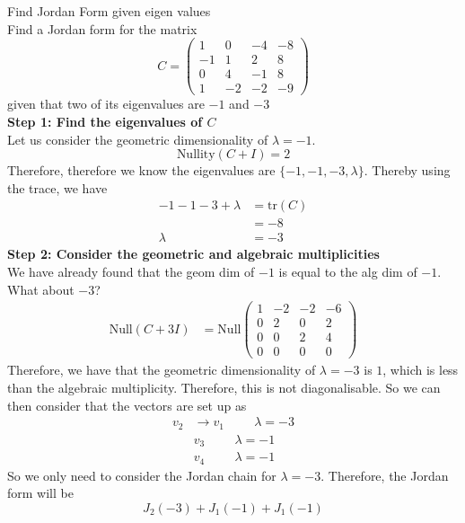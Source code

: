 \documentclass[journal, letterpaper]{IEEEtran}
\begin{document}
    \begin{myboxg}{Find Jordan Form given eigen values} \\
        Find a Jordan form for the matrix
        $$ C = \begin{pmatrix}
            1 & 0 & -4 & -8 \\ -1 & 1 & 2 & 8 \\ 0 & 4 & -1 & 8 \\ 1 & -2 & -2 & -9
        \end{pmatrix}$$
        given that two of its eigenvalues are $-1$ and $-3$
        \newline \\
        \textbf{Step 1: Find the eigenvalues of $C$}\\ Let us consider the geometric dimensionality of $\lambda = -1$.
        $$
        \text{Nullity}(C + I) = 2
        $$
        Therefore, therefore we know the eigenvalues are $\{ -1, -1, -3, \lambda \}$. Thereby using the trace, we have
        \begin{align*}
            -1 - 1 - 3 + \lambda &= \text{tr}(C) \\
            &= -8 \\
            \lambda &= -3
        \end{align*}
        \textbf{Step 2: Consider the geometric and algebraic multiplicities} \\ 
        We have already found that the geom dim of $-1$ is equal to the alg dim of $-1$. What about $-3$?
        \begin{align*}
            \text{Null}(C + 3I) &= \text{Null}\begin{pmatrix}
                1 & -2 & -2 & -6 \\ 0 & 2 & 0 & 2 \\ 0 & 0 & 2 & 4 \\ 0 & 0 & 0 & 0
            \end{pmatrix}
        \end{align*}
        Therefore, we have that the geometric dimensionality of $\lambda = -3$ is $1$, which is less than the 
        algebraic multiplicity. Therefore, this is not diagonalisable. So we can then consider that the 
        vectors are set up as
        \begin{align*}
            v_2 &\to v_1 \hspace{1cm} \lambda = -3 \\
            &v_3 \hspace{1cm} \lambda = -1 \\
            &v_4 \hspace{1cm} \lambda = -1
        \end{align*}
        So we only need to consider the Jordan chain for $\lambda = -3$. Therefore, the Jordan form will be
        $$ J_2(-3) + J_1(-1) + J_1(-1)$$
    \end{myboxg}
\end{document}

